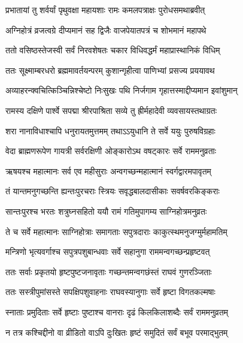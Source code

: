 
\twolineshloka
{प्रभातायां तु शर्वर्यां पृथुवक्षा महायशाः}
{रामः कमलपत्राक्षः पुरोधसमथाब्रवीत्} %

\twolineshloka
{अग्निहोत्रं व्रजत्वग्रे दीप्यमानं सह द्विजैः}
{वाजपेयातपत्रं च शोभमानं महापथे} %

\twolineshloka
{ततो वसिष्ठस्तेजस्वी सर्वं निरवशेषतः}
{चकार विधिवद्धर्मं महाप्रास्थानिकं विधिम्} %

\twolineshloka
{ततः सूक्ष्माम्बरधरो ब्रह्ममावर्तयन्परम्}
{कुशान्गृहीत्वा पाणिभ्यां प्रसज्य प्रययावथ} %

\twolineshloka
{अव्याहरन्क्वचित्किञ्चिन्निश्चेष्टो निःसुखः पथि}
{निर्जगाम गृहात्तस्माद्दीप्यमान इवांशुमान्} %

\twolineshloka
{रामस्य दक्षिणे पार्श्वे सपद्मा श्रीरपाश्रिता}
{सव्ये तु ह्रीर्महादेवी व्यवसायस्तथाग्रतः} %

\twolineshloka
{शरा नानाविधाश्चापि धनुरायतमुत्तमम्}
{तथाऽऽयुधानि ते सर्वे ययुः पुरुषविग्रहाः} %

\twolineshloka
{वेदा ब्राह्मणरूपेण गायत्री सर्वरक्षिणी}
{ओङ्कारोऽथ वषट्कारः सर्वे राममनुव्रताः} %

\twolineshloka
{ऋषयश्च महात्मानः सर्व एव महीसुराः}
{अन्वगच्छन्महात्मानं स्वर्गद्वारमपावृतम्} %

\twolineshloka
{तं यान्तमनुगच्छन्ति ह्यन्तःपुरचराः स्त्रियः}
{सवृद्धबालदासीकाः सवर्षवरकिङ्कराः} %

\twolineshloka
{सान्तःपुरश्च भरतः शत्रुघ्नसहितो ययौ}
{रामं गतिमुपागम्य साग्निहोत्रमनुव्रतः} %

\twolineshloka
{ते च सर्वे महात्मानः साग्निहोत्राः समागताः}
{सपुत्रदाराः काकुत्स्थमनुजग्मुर्महामतिम्} %

\twolineshloka
{मन्त्रिणो भृत्यवर्गाश्च सपुत्रपशुबान्धवाः}
{सर्वे सहानुगा राममन्वगच्छन्प्रहृष्टवत्} %

\twolineshloka
{ततः सर्वाः प्रकृतयो हृष्टपुष्टजनावृताः}
{गच्छन्तमन्वगछंस्तं राघवं गुणरञ्जिताः} %

\twolineshloka
{ततः सस्त्रीपुमांसस्ते सपक्षिपशुवाहनाः}
{राघवस्यानुगाः सर्वे हृष्टा विगतकल्मषाः} %

\twolineshloka
{स्नाताः प्रमुदिताः सर्वे हृष्टाः पुष्टाश्च वानराः}
{दृढं किलकिलाशब्दैः सर्वं राममनुव्रतम्} %

\twolineshloka
{न तत्र कश्चिद्दीनो वा व्रीडितो वाऽपि दुःखितः}
{हृष्टं समुदितं सर्वं बभूव परमाद्भुतम्} %

